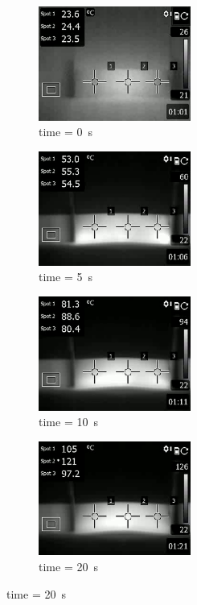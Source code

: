 \documentclass[11pt,review,times]{elsarticle}
\begin{document}
\begin{figure}[htb]
	\center
	\captionsetup{width=125mm}
	
	\begin{subfigure}{55mm}
		\center
		\captionsetup{width=50mm}
		\includegraphics[width=50mm]{t_00.png}
		\caption{time = \SI{0}{\s}}
	\end{subfigure}
	\begin{subfigure}{55mm}
		\center
		\captionsetup{width=50mm}
		\includegraphics[width=50mm]{t_05.png}
		\caption{time = \SI{5}{\s}}
	\end{subfigure}
	\begin{subfigure}{55mm}
		\center
		\captionsetup{width=50mm}
		\includegraphics[width=50mm]{t_10.png}
		\caption{time = \SI{10}{\s}}
	\end{subfigure}
	\begin{subfigure}{55mm}
		\center
		\captionsetup{width=50mm}
		\includegraphics[width=50mm]{t_20.png}
		\caption{time = \SI{20}{\s}}

\end{subfigure}
\end{figure}
\end{document}
